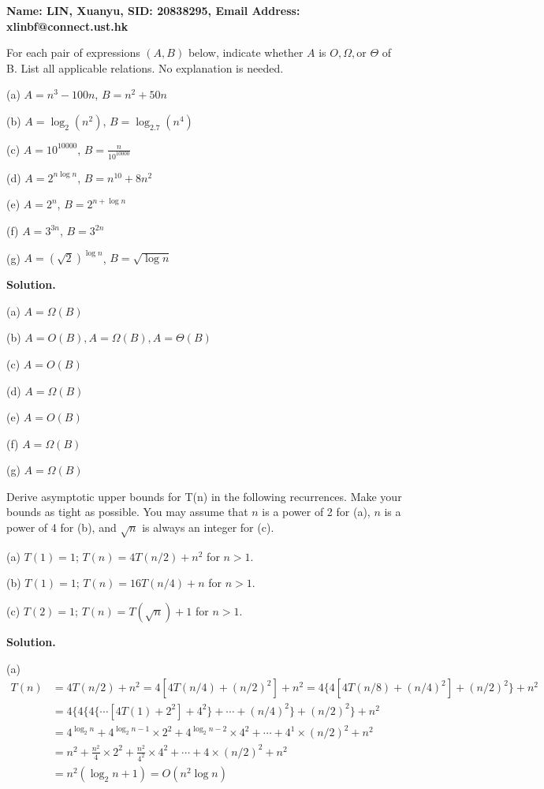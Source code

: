 \documentclass[10pt]{article}
\begin{document}
\textbf{Name: LIN, Xuanyu, SID: 20838295, Email Address: xlinbf@connect.ust.hk}

\begin{Problem}
	
	For each pair of expressions $(A, B)$ below, indicate whether $A$
	is $O, \Omega, \text{or } \Theta$ of B. List all applicable relations. No explanation is needed.
	
	\noindent (a) $A = n^3-100n$, $B = n^2+50n$
	
	\noindent (b) $A = \log_2(n^2)$, $B = \log_{2.7}(n^4)$
	
	\noindent (c) $A = 10^{10000}$, $B = \frac{n}{10^{10000}}$
	
	\noindent (d) $A = 2^{n\log n}$, $B = n^{10}+8n^2$
	
	\noindent (e) $A = 2^n$, $B = 2^{n+\log n}$
	
	\noindent (f) $A = 3^{3n}$, $B = 3^{2n}$
	
	\noindent (g) $A = (\sqrt{2})^{\log n}$, $B = \sqrt{\log n}$
	
\end{Problem}

\textbf{Solution.}
	
	(a) $A = \Omega(B)$
	
	(b) $A = O(B), A = \Omega(B), A = \Theta(B)$
	
	(c) $A = O(B)$
	
	(d) $A = \Omega(B)$
	
	(e) $A = O(B)$
	
	(f) $A = \Omega(B)$
	
	(g) $A = \Omega(B)$

\newpage

\begin{Problem}
	
	Derive asymptotic upper bounds for T(n) in the following recurrences. Make your bounds as tight as possible. You may assume that $n$ is a power of 2 for (a), $n$ is a power of 4 for (b), and $\sqrt{n}$ is always an integer for (c).
	
	\noindent (a) $T(1) = 1$; $T(n) = 4T(n/2) + n^2$ for $n>1$.
	
	\noindent (b) $T(1) = 1$; $T(n) = 16T(n/4) + n$ for $n>1$.
	
	\noindent (c) $T(2) = 1$; $T(n) = T(\sqrt{n}) + 1$ for $n>1$.
	
\end{Problem}

\textbf{Solution.}

(a)
$$
\begin{aligned}
	T(n) &= 4T(n/2) + n^2 = 4[4T(n/4) + (n/2)^2] + n^2 = 4\{4[4T(n/8) + (n/4)^2] + (n/2)^2\} + n^2\\
	&= 4\{4\{4\{\cdots [4T(1) + 2^2] + 4^2\} + \cdots + (n/4)^2\} + (n/2)^2\} + n^2\\
	&= 4^{\log_2 n} + 4^{\log_2 n - 1} \times 2^2 + 4^{\log_2 n - 2} \times 4^2 + \cdots + 4^{1} \times (n/2)^2 + n^2\\
	&= n^2 + \frac{n^2}{4} \times 2^2 + \frac{n^2}{4^2} \times 4^2 + \cdots + 4 \times (n/2)^2 + n^2\\
	&= n^2 (\log_2 n + 1) = O(n^2\log n)
\end{aligned}
$$
\end{document}
